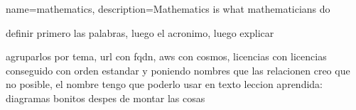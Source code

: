 \usepackage{glossaries}

\makeglossaries


{
    name=mathematics,
    description={Mathematics is what mathematicians do}
}

definir primero las palabras, luego el acronimo, luego explicar

agruparlos por tema, url con fqdn, aws con cosmos, licencias con licencias
	conseguido con orden estandar y poniendo nombres que las relacionen
		creo que no posible, el nombre tengo que poderlo usar en texto
leccion aprendida: diagramas bonitos despes de montar las cosas
